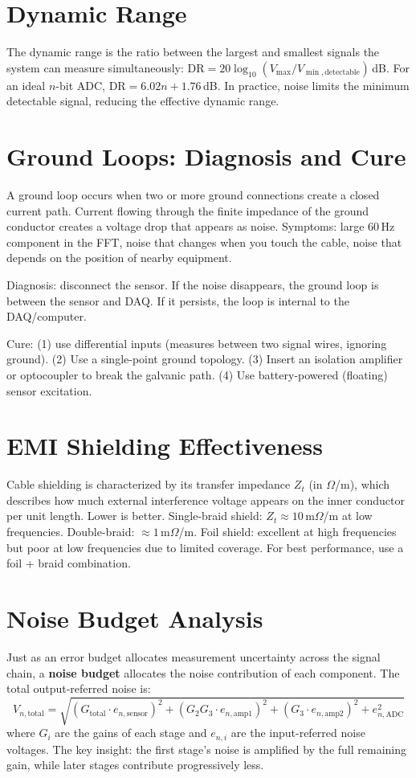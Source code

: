 \documentclass[11pt,letterpaper,twoside,openany]{book}
\begin{document}
\section{Dynamic Range}
The dynamic range is the ratio between the largest and smallest signals the system can measure simultaneously: $\text{DR} = 20\log_{10}(V_{\max}/V_{\min,\text{detectable}})$\,dB. For an ideal $n$-bit ADC, $\text{DR} = 6.02n + 1.76$\,dB. In practice, noise limits the minimum detectable signal, reducing the effective dynamic range.

\section{Ground Loops: Diagnosis and Cure}
A ground loop occurs when two or more ground connections create a closed current path. Current flowing through the finite impedance of the ground conductor creates a voltage drop that appears as noise. Symptoms: large 60\,Hz component in the FFT, noise that changes when you touch the cable, noise that depends on the position of nearby equipment.

Diagnosis: disconnect the sensor. If the noise disappears, the ground loop is between the sensor and DAQ. If it persists, the loop is internal to the DAQ/computer.

Cure: (1) use differential inputs (measures between two signal wires, ignoring ground). (2) Use a single-point ground topology. (3) Insert an isolation amplifier or optocoupler to break the galvanic path. (4) Use battery-powered (floating) sensor excitation.

\section{EMI Shielding Effectiveness}
Cable shielding is characterized by its transfer impedance $Z_t$ (in $\Omega$/m), which describes how much external interference voltage appears on the inner conductor per unit length. Lower is better. Single-braid shield: $Z_t \approx 10$\,m$\Omega$/m at low frequencies. Double-braid: $\approx 1$\,m$\Omega$/m. Foil shield: excellent at high frequencies but poor at low frequencies due to limited coverage. For best performance, use a foil + braid combination.
\section{Noise Budget Analysis}
Just as an error budget allocates measurement uncertainty across the signal chain, a \textbf{noise budget} allocates the noise contribution of each component. The total output-referred noise is:
\begin{equation}
V_{n,\text{total}} = \sqrt{(G_{\text{total}} \cdot e_{n,\text{sensor}})^2 + (G_2 G_3 \cdot e_{n,\text{amp1}})^2 + (G_3 \cdot e_{n,\text{amp2}})^2 + e_{n,\text{ADC}}^2}
\end{equation}
where $G_i$ are the gains of each stage and $e_{n,i}$ are the input-referred noise voltages. The key insight: the first stage's noise is amplified by the full remaining gain, while later stages contribute progressively less.
\end{document}
